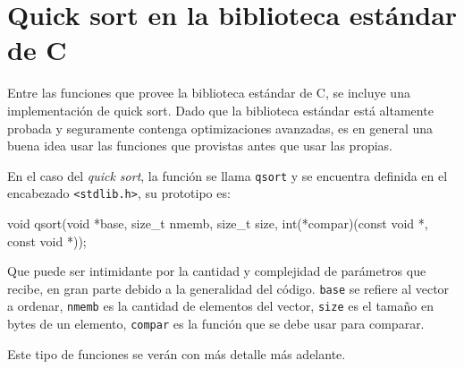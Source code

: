 \section{Quick sort en la biblioteca estándar de C}

Entre las funciones que provee la biblioteca estándar de C, se incluye una
implementación de quick sort. Dado que la biblioteca estándar está altamente
probada y seguramente contenga optimizaciones avanzadas, es en general una
buena idea usar las funciones que provistas antes que usar las propias.

En el caso del \textit{quick sort}, la función se llama \lstinline!qsort! y se
encuentra definida en el encabezado \lstinline!<stdlib.h>!, su prototipo es:

\begin{codigo-c}
void qsort(void *base, size_t nmemb, size_t size,
           int(*compar)(const void *, const void *));
\end{codigo-c}

Que puede ser intimidante por la cantidad y complejidad de parámetros que
recibe, en gran parte debido a la generalidad del código. \lstinline!base! se
refiere al vector a ordenar, \lstinline!nmemb! es la cantidad de elementos
del vector, \lstinline!size! es el tamaño en bytes de un elemento,
\lstinline!compar! es la función que se debe usar para comparar.

Este tipo de funciones se verán con más detalle más adelante.

